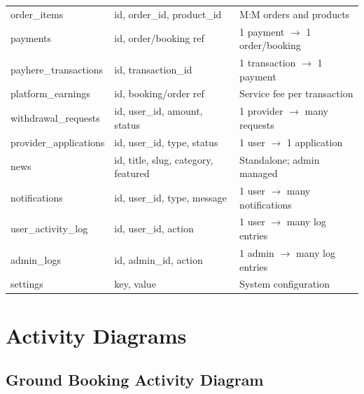 \documentclass[12pt,a4paper]{report}
\begin{document}
\begin{center}
\begin{longtable}{p{4.5cm} p{4cm} p{5.5cm}}
order\_items           & id, order\_id, product\_id              & M:M orders and products\\
payments               & id, order/booking ref                   & 1 payment $\to$ 1 order/booking\\
payhere\_transactions  & id, transaction\_id                     & 1 transaction $\to$ 1 payment\\
platform\_earnings     & id, booking/order ref                   & Service fee per transaction\\
withdrawal\_requests   & id, user\_id, amount, status            & 1 provider $\to$ many requests\\
provider\_applications & id, user\_id, type, status              & 1 user $\to$ 1 application\\
news                   & id, title, slug, category, featured     & Standalone; admin managed\\
notifications          & id, user\_id, type, message             & 1 user $\to$ many notifications\\
user\_activity\_log    & id, user\_id, action                    & 1 user $\to$ many log entries\\
admin\_logs            & id, admin\_id, action                   & 1 admin $\to$ many log entries\\
settings               & key, value                              & System configuration\\
\bottomrule
\end{longtable}
\end{center}

\section{Activity Diagrams}

\subsection{Ground Booking Activity Diagram}
\end{document}
